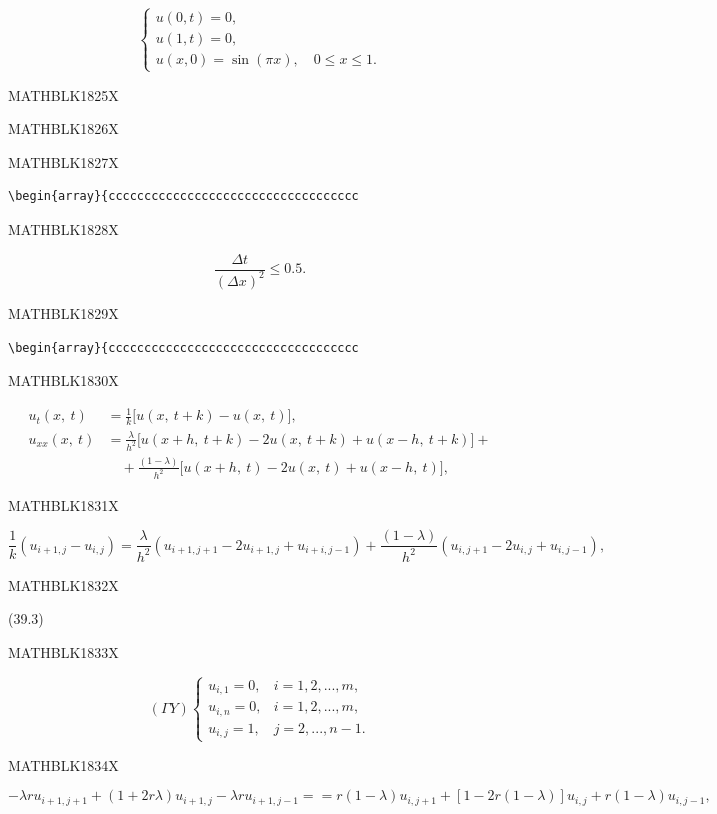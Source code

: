 \documentclass[
]{article}
\begin{document}
\[
\begin{cases} u(0, t) = 0, \\ u(1, t) = 0, \\ u(x, 0) = \sin(\pi x), \quad 0 \le x \le 1. \end{cases}
\]

MATHBLK1825X

MATHBLK1826X

MATHBLK1827X

\begin{verbatim}
\begin{array}{ccccccccccccccccccccccccccccccccccc
\end{verbatim}

MATHBLK1828X

\[
\frac{\Delta t}{(\Delta x)^2} \leqslant 0.5.
\]

MATHBLK1829X

\begin{verbatim}
\begin{array}{ccccccccccccccccccccccccccccccccccc
\end{verbatim}

MATHBLK1830X

\[
\begin{split} u_t(x,\ t) &= \frac{1}{k} \big[ u(x,\ t+k) - u(x,\ t) \big], \\ u_{xx}(x,\ t) &= \frac{\lambda}{h^2} \big[ u(x+h,\ t+k) - 2u(x,\ t+k) + u(x-h,\ t+k) \big] + \\ &\quad + \frac{(1-\lambda)}{h^2} \big[ u(x+h,\ t) - 2u(x,\ t) + u(x-h,\ t) \big], \end{split}
\]

MATHBLK1831X

\[
\frac{1}{k} (u_{i+1, j} - u_{i, j}) = \frac{\lambda}{h^2} (u_{i+1, j+1} - 2u_{i+1, j} + u_{i+i, j-1}) + \frac{(1-\lambda)}{h^2} (u_{i, j+1} - 2u_{i, j} + u_{i, j-1}),
\]

MATHBLK1832X

(39.3)

MATHBLK1833X

\[
(\Gamma Y) \begin{cases} u_{i, 1} = 0, & i = 1, 2, ..., m, \\ u_{i, n} = 0, & i = 1, 2, ..., m, \\ u_{i, j} = 1, & j = 2, ..., n-1. \end{cases}
\]

MATHBLK1834X

\[
-\lambda r u_{i+1, j+1} + (1+2r\lambda) u_{i+1, j} - \lambda r u_{i+1, j-1} = = r(1-\lambda) u_{i, j+1} + [1-2r(1-\lambda)] u_{i, j} + r(1-\lambda) u_{i, j-1},
\]
\end{document}
